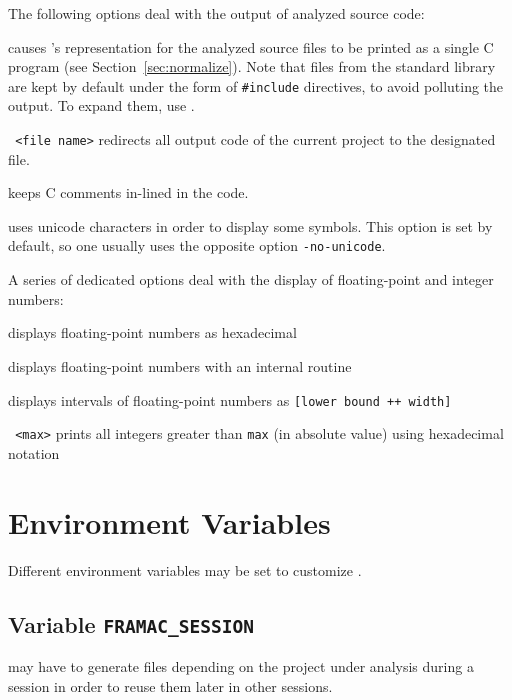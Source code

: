 The following options deal with the output of analyzed source code:
\begin{description}
\item {} causes \FramaC's representation for the analyzed
  source files to be printed as a single C program (see
  Section~\ref{sec:normalize}). Note that files from the \FramaC standard
  library are kept by default under the form of \texttt{\#include} directives,
  to avoid polluting the output. To expand them, use .
\item \texttt{ <file name>} redirects all output code of the
  current project to the designated file.
\item {} keeps C comments in-lined in the code.
\item {} uses unicode characters in order to display some
  \acsl symbols. This option is set by default, so one usually uses the opposite
  option \texttt{-no-unicode}.
\end{description}
A series of dedicated options deal with the display of floating-point and
integer numbers:
\begin{description}
\item {} displays floating-point
  numbers as hexadecimal
\item {} displays floating-point numbers
  with an internal routine
\item {} displays intervals of
  floating-point numbers as \texttt{[lower bound ++ width]}
\item \texttt{ <max>} prints all integers greater
  than \texttt{max} (in absolute value) using hexadecimal notation
\end{description}

\section{Environment Variables}\label{sec:env-variables}

Different environment variables may be set to customize \FramaC.

\subsection{Variable \texttt{FRAMAC\_SESSION}}\label{sec:var-session}

\FramaC may have to generate files depending on the project under analysis
during a session in order to reuse them later in other sessions.

